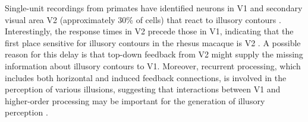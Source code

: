 \documentclass[12pt]{article}
\begin{document}
Single-unit recordings from primates have identified neurons in V1 and secondary visual area V2 (approximately 30\% of cells) that react to illusory contours \autocite{vonderheydtMechanismsContourPerception1989}. Interestingly, the response times in V2 precede those in V1, indicating that the first place sensitive for illusory contours in the rhesus macaque is V2 \autocite{leeDynamicsSubjectiveContour2001}. A possible reason for this delay is that top-down feedback from V2 might supply the missing information about illusory contours to V1. Moreover, recurrent processing, which includes both horizontal and induced feedback connections, is involved in the perception of various illusions, suggesting that interactions between V1 and higher-order processing may be important for the generation of illusory perception \autocite{deweerdCuedependentDeficitsGrating1996,mendolaRepresentationIllusoryReal1999,panEquivalentRepresentationReal2012,roelfsemaCORTICALALGORITHMSPERCEPTUAL2006}.
\end{document}

